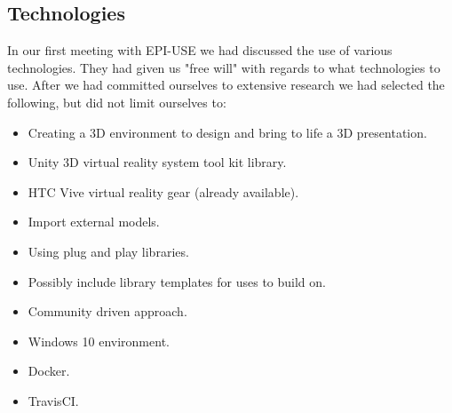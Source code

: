 \subsection{Technologies}
	In our first meeting with EPI-USE we had discussed the use of various technologies. They had given us "free will" with regards to what technologies to use. After we had committed ourselves to extensive research we had selected the following, but did not limit ourselves to:
	\begin{itemize}
		\item Creating a 3D environment to design and bring to life a 3D presentation.
		\item Unity 3D virtual reality system tool kit library.
		\item HTC Vive virtual reality gear (already available).
		\item Import external models.
		\item Using plug and play libraries.
		\item Possibly include library templates for uses to build on.
		\item Community driven approach.
		\item Windows 10 environment.
		\item Docker.
		\item TravisCI.
	\end{itemize}
